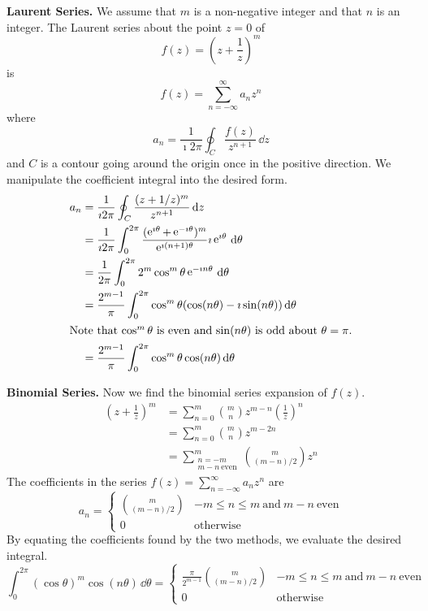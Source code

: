 {%
\begin{Solution}
  \label{solution int (cos t)^m cos nt}
  \textbf{Laurent Series.}
  We assume that $m$ is a non-negative integer and that $n$ is an integer.
  The Laurent series about the point $z = 0$ of 
  \[
  f(z) = \left( z + \frac{1}{z} \right)^m
  \]
  is 
  \[
  f(z) = \sum_{n = -\infty}^\infty a_n z^n
  \]
  where
  \[
  a_n = \frac{1}{\imath 2 \pi} \oint_C \frac{ f(z) }{ z^{n+1} } \,\dd z
  \]
  and $C$ is a contour going around the origin once in the positive direction.
  We manipulate the coefficient integral into the desired form.
  \begin{align*}
    a_n     
    &= \frac{1}{\imath 2 \pi} \oint_C \frac{ (z + 1/z)^m }{ z^{n+1} } \,\mathrm{d} z 
    \\
    &= \frac{1}{\imath 2 \pi} \int_0^{2 \pi} \frac{ (\mathop{\mathrm{e}}\nolimits^{\imath \theta} + \mathop{\mathrm{e}}\nolimits^{-\imath \theta} )^m }{ \mathop{\mathrm{e}}\nolimits^{\imath (n+1) \theta } }
    \imath \mathop{\mathrm{e}}\nolimits^{ \imath \theta }\,\mathrm{d} \theta 
    \\
    &= \frac{1}{2 \pi} \int_0^{2 \pi} 2^m \cos^m \theta \mathop{\mathrm{e}}\nolimits^{-\imath n \theta}\,\mathrm{d} \theta 
    \\
    &= \frac{ 2^{m-1} }{ \pi } \int_0^{2 \pi} \cos^m \theta ( \cos(n \theta) - \imath \sin(n \theta) )\,\mathrm{d} \theta 
    \\
    \intertext{Note that $\cos^m \theta$ is even and $\sin(n \theta)$ is odd 
      about $\theta = \pi$.}
    &= \frac{ 2^{m-1} }{ \pi } \int_0^{2 \pi} \cos^m \theta \cos(n \theta)\,\mathrm{d} \theta 
    \\
  \end{align*}

  \textbf{Binomial Series.}
  Now we find the binomial series expansion of $f(z)$.
  \begin{align*}
    \left( z + \frac{1}{z} \right)^m
    &= \sum_{n = 0}^m \binom{m}{n} z^{m-n} \left( \frac{1}{z} \right)^n 
    \\
    &= \sum_{n = 0}^m \binom{m}{n} z^{m-2n} 
    \\
    &= \sum_{\substack{n = -m\\m-n\ \mathrm{even}}}^m \binom{m}{(m-n)/2} z^n
  \end{align*}
  The coefficients in the series $f(z) = \sum_{n = -\infty}^\infty a_n z^n$ are
  \[
  a_n = 
  \begin{cases}
    \binom{m}{(m-n)/2} &-m \leq n \leq m\ \mathrm{and}\ m - n\ \mathrm{even} \\
    0 &\mathrm{otherwise}
  \end{cases}
  \]
  By equating the coefficients found by the two methods, we evaluate the 
  desired integral.
  \[
  \boxed{
    \int_0^{2\pi} (\cos \theta)^m \cos(n \theta)\,\dd \theta =
    \begin{cases}
      \frac{\pi}{2^{m-1}} \binom{m}{(m - n)/2} 
      &-m \leq n \leq m\ \mathrm{and}\ m-n\ \mathrm{even} \\
      0
      &\mathrm{otherwise}
    \end{cases}
    }
  \]
\end{Solution}


}
